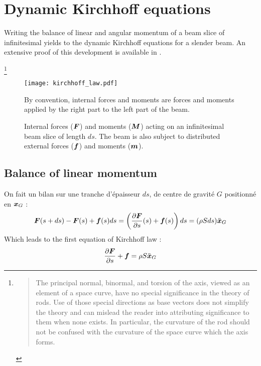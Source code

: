 \section{Dynamic Kirchhoff equations}

Writing the balance of linear and angular momentum of a beam slice of infinitesimal yields to the dynamic Kirchhoff equations for a slender beam. An extensive proof of this development is available in \cite{Dill1992}.

\footnote{\blockcquote[p.5]{Dill1992}{The principal normal, binormal, and torsion of the axis, viewed as an element of a space curve, have no special significance in the theory of rods. Use of those special directions as base vectors does not simplify the theory and can mislead the reader into attributing significance to them when none exists. In particular, the curvature of the rod should not be confused with the curvature of the space curve which the axis forms.}}

\begin{figure}[t]
	\centering
	\texttt{[image: kirchhoff\_law.pdf]}
	\caption{Internal forces ($\boldsymbol{F}$) and moments ($\boldsymbol{M}$) acting on an infinitesimal beam slice of length $ds$. The beam is also subject to distributed external forces ($\boldsymbol{f}$) and moments ($\boldsymbol{m}$).} By convention, internal forces and moments are forces and moments applied by the right part to the left part of the beam.
	\label{fig:5_0}
\end{figure}

\subsection{Balance of linear momentum}
On fait un bilan sur une tranche d'épaisseur $ds$, de centre de gravité $G$ positionné en $\boldsymbol{x}_G$ :
\begin{equation}
	\boldsymbol{F}(s+ds)-\boldsymbol{F}(s) + \boldsymbol{f}(s)ds = \left(\frac{\partial \boldsymbol{F}}{\partial s}(s)+\boldsymbol{f}(s)\right)ds = (\rho Sds)\ddot{\boldsymbol{x}}_G
\end{equation}
Which leads to the first equation of Kirchhoff law :
\begin{equation}
	\frac{\partial \boldsymbol{F}}{\partial s}+\boldsymbol{f} = \rho S \ddot{\boldsymbol{x}}_G
\end{equation}

